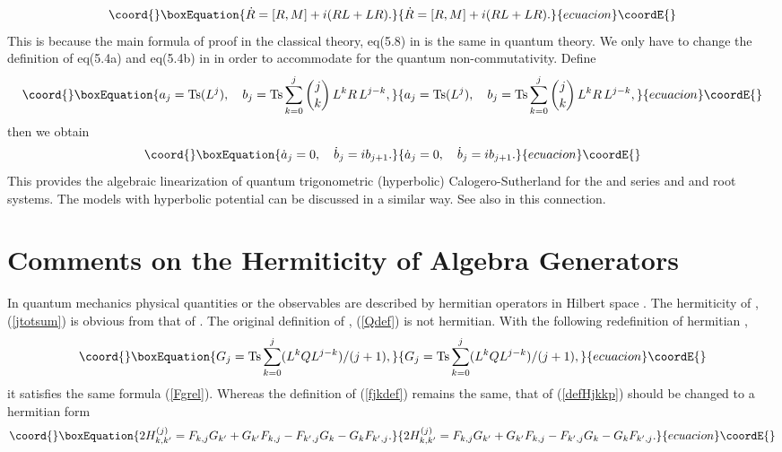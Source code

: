 \documentclass[a4paper,12pt]{article}
\begin{document}
\begin{equation}\coord{}\boxEquation{
\dot{R}=[R,M]+i(RL+LR).
}{
\dot{R}=[R,M]+i(RL+LR).
}{ecuacion}\coordE{}\end{equation}
This is because the main formula of proof
in the classical theory, eq(5.8) in
\cite{cfs} is the same in quantum theory.
We only have to change the definition of \coordHE{} eq(5.4a) and \coordHE{} eq(5.4b)
in
\cite{cfs} in order to accommodate for the quantum non-commutativity.
Define
\begin{equation}\coord{}\boxEquation{\label{TFks}
  a_j=\mbox{Ts}(L^j),\quad
  b_j=\mbox{Ts}\sum_{k=0}^j{j \choose k}
    \, L^k R\, L^{j-k},
}{a_j=\mbox{Ts}(L^j),\quad
  b_j=\mbox{Ts}\sum_{k=0}^j{j \choose k}
    \, L^k R\, L^{j-k},
}{ecuacion}\coordE{}\end{equation}
then we obtain
\begin{equation}\coord{}\boxEquation{
\dot{a}_j=0,\quad \dot{b}_j=ib_{j+1}.
}{
\dot{a}_j=0,\quad \dot{b}_j=ib_{j+1}.
}{ecuacion}\coordE{}\end{equation}
This provides the algebraic linearization of quantum
trigonometric (hyperbolic) Calogero-Sutherland for the
\coordHE{} and \coordHE{} series and \coordHE{} and \coordHE{} root systems.
The models with hyperbolic potential can be discussed in a
similar way.
See also \cite{Gonera2,ttw} in this connection.

\section{Comments on the Hermiticity of Algebra Generators}
\label{comm}
\setcounter{equation}{0}
In quantum mechanics physical quantities or the observables are
described by hermitian operators in Hilbert space \cite{Gonera1}.
The hermiticity of \coordHE{}, (\ref{jtotsum}) is obvious from that of \coordHE{}.
The original definition of \coordHE{}, (\ref{Qdef}) is not hermitian.
With the following redefinition of hermitian \coordHE{},
\begin{equation}\coord{}\boxEquation{
G_j=\mbox{Ts}\sum_{k=0}^j(L^kQL^{j-k})/(j+1),
}{
G_j=\mbox{Ts}\sum_{k=0}^j(L^kQL^{j-k})/(j+1),
}{ecuacion}\coordE{}\end{equation}
it satisfies the same formula (\ref{Fgrel}).
Whereas the definition of \coordHE{} (\ref{fjkdef}) remains the same,
that of  \coordHE{} (\ref{defHjkkp}) should be changed to
a hermitian form
\begin{equation}\coord{}\boxEquation{
2H_{k,k'}^{(j)}=F_{k,j}G_{k'}+G_{k'}F_{k,j}-
F_{k',j}G_{k}-G_{k}F_{k',j}.\label{newdefHjkkp}
}{
2H_{k,k'}^{(j)}=F_{k,j}G_{k'}+G_{k'}F_{k,j}-
F_{k',j}G_{k}-G_{k}F_{k',j}.}{ecuacion}\coordE{}\end{equation}
\end{document}
